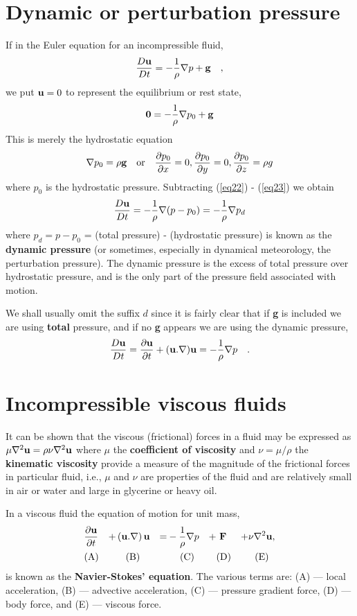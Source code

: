 \documentclass[10pt]{report}
\begin{document}
\section{Dynamic or perturbation pressure}

If in the Euler equation for an incompressible fluid,
\begin{equation}
\label{eq22}
\frac{D{{\bf u}}}{Dt}=-\frac{1}{\rho }\nabla p+{\rm
{\bf g}}\quad ,
\end{equation}
we put ${\bf u}=0$ to represent the equilibrium or rest state,
\begin{equation}
\label{eq23}
{{\bf 0}}=-\frac{1}{\rho }\nabla p_0 +{{\bf g}}
\end{equation}
This is merely the hydrostatic equation
\[
\nabla p_0 =\rho {{\bf g}}\quad \mbox{or}\quad \frac{\partial
p_0 }{\partial x}=0,\frac{\partial p_0 }{\partial
y}=0,\frac{\partial p_0 }{\partial z}=\rho g
\]
where $p_0$ is the hydrostatic pressure. Subtracting (\ref{eq22}) - (\ref{eq23}) we
obtain
\[
\frac{D{{\bf u}}}{Dt}=-\frac{1}{\rho }\nabla (p-p_0
)=-\frac{1}{\rho }\nabla p_d
\]
where $p_{d} = p - p_{0}$ = (total pressure) - (hydrostatic pressure) is
known as the \textbf{dynamic pressure} (or sometimes, especially in
dynamical meteorology, the perturbation pressure). The dynamic pressure is
the excess of total pressure over hydrostatic pressure, and is the only part
of the pressure field associated with motion.

We shall usually omit the suffix $d$ since it is fairly clear that if
\textbf{g} is included we are using \textbf{total} pressure, and if no
\textbf{g} appears we are using the dynamic pressure,
\[
\frac{D{{\bf u}}}{Dt}=\frac{\partial {{\bf u}}}{\partial
t}+({{\bf u}}. \nabla ){{\bf
u}}=-\frac{1}{\rho }\nabla p\quad .
\]

\section{Incompressible viscous fluids}

It can be shown that the viscous (frictional) forces in a fluid may be
expressed as $\mu \nabla ^2{\bf u}=\rho \nu \nabla ^2{\bf u}$ where \textit{$\mu $} the
\textbf{coefficient of viscosity} and $\nu =\mu /\rho $ the
\textbf{kinematic viscosity} provide a measure of the magnitude of the
frictional forces in particular fluid, i.e., $\mu $ and $\nu $ are
properties of the fluid and are relatively small in air or water and large
in glycerine or heavy oil.

In a viscous fluid the equation of motion for unit mass,
\begin{alignat}{5}
& \frac{\partial {\bf u}}{\partial t} & +
& \left( {{{\bf u}}. \nabla } \right){{\bf u}}  & =
& -\frac{1}{\rho }\nabla p & + &\  \textbf{F} & + &\nu \nabla ^2{\bf u}, \label{eq:NavierStokes}\\
&\hbox{(A)}&
&\ \ \ \hbox{(B) }&
&\ \ \ \ \hbox{(C)}&
&\hbox{(D)}&
&\ \ \hbox{(E)} \nonumber
\end{alignat}
is known as the \textbf{Navier-Stokes' equation}. The various terms are: (A) --- local acceleration, (B) --- advective acceleration, (C) --- pressure gradient force, (D) --- body force, and (E) --- viscous force.
\end{document}
